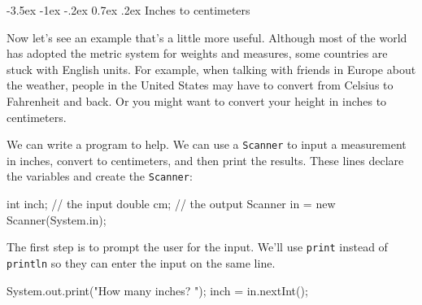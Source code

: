 \documentclass[12pt]{book}
\makeatletter
\theoremstyle{exercise}
\newcommand{\java}[1]{\verb"#1"}
\renewcommand{\section}{\@startsection {section}{1}{\z@}%
    {-3.5ex \@plus -1ex \@minus -.2ex}%
    {0.7ex \@plus.2ex}%
    {\normalfont\Large\bfseries}}
\newcommand{\java}[1]{\lstinline{#1}} %
\makeatother
\begin{document}
\section{Inches to centimeters}

Now let's see an example that's a little more useful.
Although most of the world has adopted the metric system for weights and measures, some countries are stuck with English units.
For example, when talking with friends in Europe about the weather, people in the United States may have to convert from Celsius to Fahrenheit and back.
Or you might want to convert your height in inches to centimeters.


We can write a program to help.
We can use a \java{Scanner} to input a measurement in inches, convert to centimeters, and then print the results.
These lines declare the variables and create the \java{Scanner}:



\begin{code}
    int inch;  // the input
    double cm;  // the output
    Scanner in = new Scanner(System.in);
\end{code}

The first step is to prompt the user for the input.
We'll use \java{print} instead of \java{println} so they can enter the input on the same line.

\begin{code}
    System.out.print("How many inches? ");
    inch = in.nextInt();
\end{code}
\end{document}
